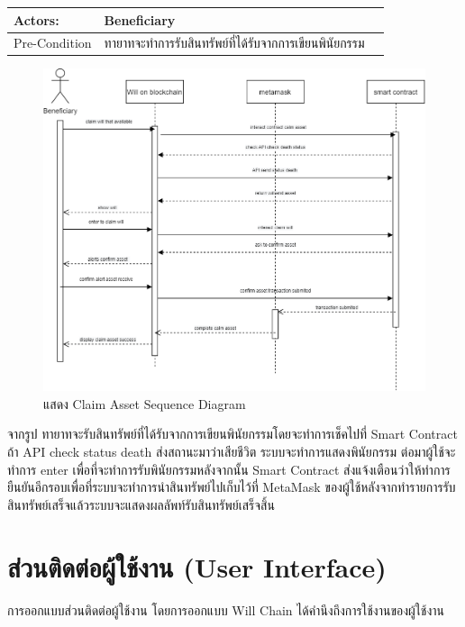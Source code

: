 \documentclass[12pt,oneside,openright,a4paper]{cpe-thai-project}
\begin{document}
\begin{enumerate}[label=\thesubsection.\arabic*,leftmargin=0pt,itemindent=1.25cm]
\begin{table}[h]
\begin{tabularx}{\textwidth}{|l|X|X|}
\hline
Actors:        & Beneficiary                                            \\ 
\hline
Pre-Condition  & ทายาทจะทำการรับสินทรัพย์ที่ได้รับจากการเขียนพินัยกรรม  \\
\hline
\end{tabularx}
\end{table}
		\begin{figure}[!thb]
			\centering
			\includegraphics[scale=0.45]{calmAssetseq}
			\caption{แสดง Claim Asset Sequence Diagram}
		\end{figure}
		\FloatBarrier
	\tab จากรูป ทายาทจะรับสินทรัพย์ที่ได้รับจากการเขียนพินัยกรรมโดยจะทำการเช็คไปที่ Smart Contract ถ้า API check status death ส่งสถานะมาว่าเสียชีวิต ระบบจะทำการแสดงพินัยกรรม ต่อมาผู้ใช้จะทำการ enter เพื่อที่จะทำการรับพินัยกรรมหลังจากนั้น Smart Contract ส่งแจ้งเตือนว่าให้ทำการยืนยันอีกรอบเพื่อที่ระบบจะทำการนำสินทรัพย์ไปเก็บไว้ที่ MetaMask ของผู้ใช้หลังจากทำรายการรับสินทรัพย์เสร็จแล้วระบบจะแสดงผลลัพท์รับสินทรัพย์เสร็จสิ้น
	\end{enumerate}
\clearpage
\section{ส่วนติดต่อผู้ใช้งาน (User Interface)}
\tab การออกแบบส่วนติดต่อผู้ใช้งาน โดยการออกแบบ Will Chain ได้คำนึงถึงการใช้งานของผู้ใช้งาน 
\end{document}
